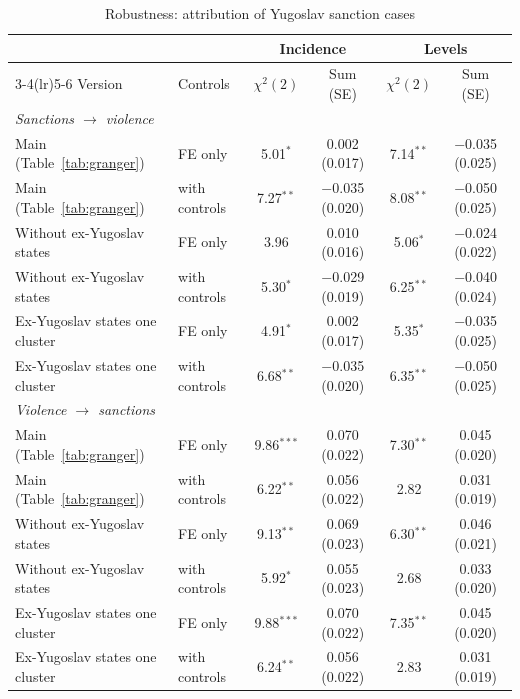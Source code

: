 \begin{table}[htbp]
\centering
\footnotesize
\caption{Robustness: attribution of Yugoslav sanction cases}
\label{tab:yugoslavia}
\begin{threeparttable}
\begin{tabular}{llcccc}
\toprule
 & & \multicolumn{2}{c}{Incidence} & \multicolumn{2}{c}{Levels} \\
\cmidrule(lr){3-4}\cmidrule(lr){5-6}
Version & Controls & $\chi^2(2)$ & Sum (SE) & $\chi^2(2)$ & Sum (SE) \\
\midrule
\multicolumn{6}{l}{\textit{Sanctions $\rightarrow$ violence}} \\
\quad Main (Table~\ref{tab:granger}) & FE only & 5.01$^{*}$ & 0.002 (0.017) & 7.14$^{**}$ & $-$0.035 (0.025) \\
\quad Main (Table~\ref{tab:granger}) & with controls & 7.27$^{**}$ & $-$0.035 (0.020) & 8.08$^{**}$ & $-$0.050 (0.025) \\
\quad Without ex-Yugoslav states & FE only & 3.96 & 0.010 (0.016) & 5.06$^{*}$ & $-$0.024 (0.022) \\
\quad Without ex-Yugoslav states & with controls & 5.30$^{*}$ & $-$0.029 (0.019) & 6.25$^{**}$ & $-$0.040 (0.024) \\
\quad Ex-Yugoslav states one cluster & FE only & 4.91$^{*}$ & 0.002 (0.017) & 5.35$^{*}$ & $-$0.035 (0.025) \\
\quad Ex-Yugoslav states one cluster & with controls & 6.68$^{**}$ & $-$0.035 (0.020) & 6.35$^{**}$ & $-$0.050 (0.025) \\
\midrule
\multicolumn{6}{l}{\textit{Violence $\rightarrow$ sanctions}} \\
\quad Main (Table~\ref{tab:granger}) & FE only & 9.86$^{***}$ & 0.070 (0.022) & 7.30$^{**}$ & 0.045 (0.020) \\
\quad Main (Table~\ref{tab:granger}) & with controls & 6.22$^{**}$ & 0.056 (0.022) & 2.82 & 0.031 (0.019) \\
\quad Without ex-Yugoslav states & FE only & 9.13$^{**}$ & 0.069 (0.023) & 6.30$^{**}$ & 0.046 (0.021) \\
\quad Without ex-Yugoslav states & with controls & 5.92$^{*}$ & 0.055 (0.023) & 2.68 & 0.033 (0.020) \\
\quad Ex-Yugoslav states one cluster & FE only & 9.88$^{***}$ & 0.070 (0.022) & 7.35$^{**}$ & 0.045 (0.020) \\
\quad Ex-Yugoslav states one cluster & with controls & 6.24$^{**}$ & 0.056 (0.022) & 2.83 & 0.031 (0.019) \\

\end{tabular}
\end{threeparttable}
\end{table}
